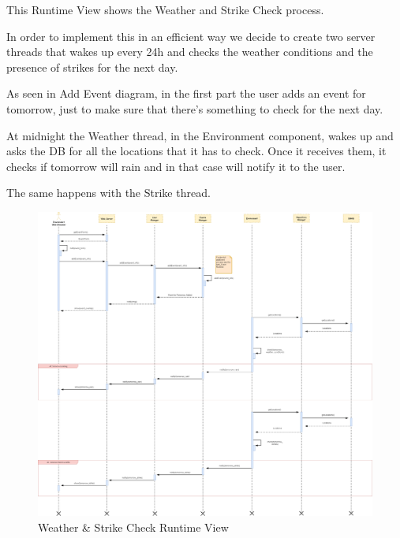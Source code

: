 This Runtime View shows the Weather and Strike Check process.\par
In order to implement this in an efficient way we decide to create two server threads that wakes up every 24h and checks the weather conditions and the presence of strikes for the next day.\par
As seen in Add Event diagram, in the first part the user adds an event for tomorrow, just to make sure that there’s something to check for the next day.\par
At midnight the Weather thread, in the Environment component, wakes up and asks the DB for all the locations that it has to check. Once it receives them, it checks if tomorrow will rain and in that case will notify it to the user.\par
The same happens with the Strike thread.
\begin{figure}[H]
	\centering
	\includegraphics[scale=0.165]{Images/Runtime/Weather_Strike_Check}
	\caption{Weather \& Strike Check Runtime View}
\end{figure}

